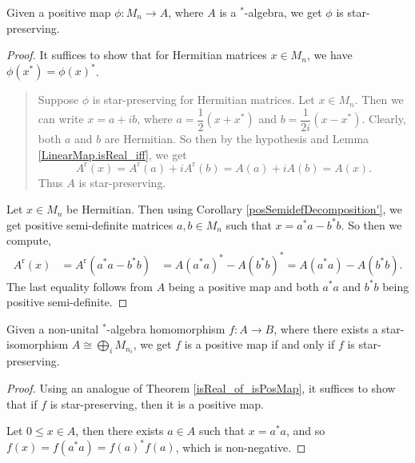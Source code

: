  \begin{theorem}\label{isReal_of_isPosMap}
  \leanok
  Given a positive map $\phi\colon M_n \to A$, where $A$ is a $^*$-algebra, we get $\phi$ is star-preserving.
 \end{theorem}
 \begin{proof}
  \leanok
  It suffices to show that for Hermitian matrices $x\in M_n$, we have $\phi(x^*)=\phi(x)^*$.
  \begin{quote}
   Suppose $\phi$ is star-preserving for Hermitian matrices.
   Let $x\in M_n$. Then we can write $x=a+ib$, where $a=\dfrac{1}{2}(x+x^*)$ and $b=\dfrac{1}{2i}(x-x^*)$. Clearly, both $a$ and $b$ are Hermitian. So then by the hypothesis and Lemma \ref{LinearMap.isReal_iff}, we get
   \[A^\operatorname{r}(x)=A^{\operatorname{r}}(a)+iA^{\operatorname{r}}(b)=A(a)+iA(b)=A(x).\]
   Thus $A$ is star-preserving.
  \end{quote}
  Let $x\in M_n$ be Hermitian. Then using Corollary \ref{posSemidefDecomposition'}, we get positive semi-definite matrices $a,b\in{M_n}$ such that $x=a^*a-b^*b$. So then we compute,
  \begin{align*}
   A^{\operatorname{r}}(x) &={A}^{\operatorname{r}}(a^*a-b^*b)
    &= {A(a^*a)}^*-{A(b^*b)}^*=A(a^*a)-A(b^*b).
  \end{align*}
  The last equality follows from $A$ being a positive map and both $a^*a$ and $b^*b$ being positive semi-definite.
 \end{proof}

 \begin{corollary}\label{NonUnitalAlgHom.isPosMap_iff}
  \leanok
  Given a non-unital $^*$-algebra homomorphism $f\colon A \to B$, where there exists a star-isomorphism $A\cong\bigoplus_iM_{n_i}$, we get $f$ is a positive map if and only if $f$ is star-preserving.
 \end{corollary}
 \begin{proof}\leanok
  Using an analogue of Theorem \ref{isReal_of_isPosMap}, it suffices to show that if $f$ is star-preserving, then it is a positive map.
  
  Let $0\leq x\in A$, then there exists $a\in A$ such that $x=a^*a$, and so $f(x)=f(a^*a)=f(a)^*f(a)$, which is non-negative.
 \end{proof}
